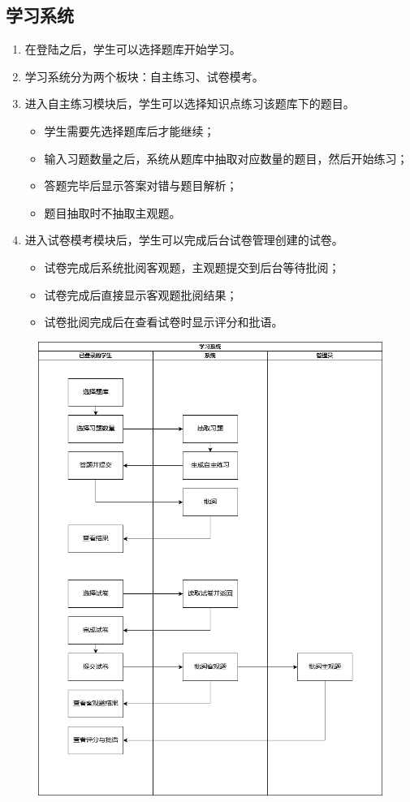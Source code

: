 \documentclass{article}
\begin{document}
    \subsection{学习系统}
    	\begin{enumerate}
    		\item 在登陆之后，学生可以选择题库开始学习。
    		\item 学习系统分为两个板块：自主练习、试卷模考。
    		\item 进入自主练习模块后，学生可以选择知识点练习该题库下的题目。
    		\begin{itemize}
    			\item 学生需要先选择题库后才能继续；
    			\item 输入习题数量之后，系统从题库中抽取对应数量的题目，然后开始练习；
    			\item 答题完毕后显示答案对错与题目解析；
    			\item 题目抽取时不抽取主观题。
    		\end{itemize}
   			\item 进入试卷模考模块后，学生可以完成后台试卷管理创建的试卷。
   			\begin{itemize}
   				\item 试卷完成后系统批阅客观题，主观题提交到后台等待批阅；
   				\item 试卷完成后直接显示客观题批阅结果；
   				\item 试卷批阅完成后在查看试卷时显示评分和批语。
   			\end{itemize}
    	\end{enumerate}
	    \begin{figure}[H]
		    \centering
		    \includegraphics[width=.8\textwidth]{./LearningSystem.png}
		\end{figure}
\end{document}
